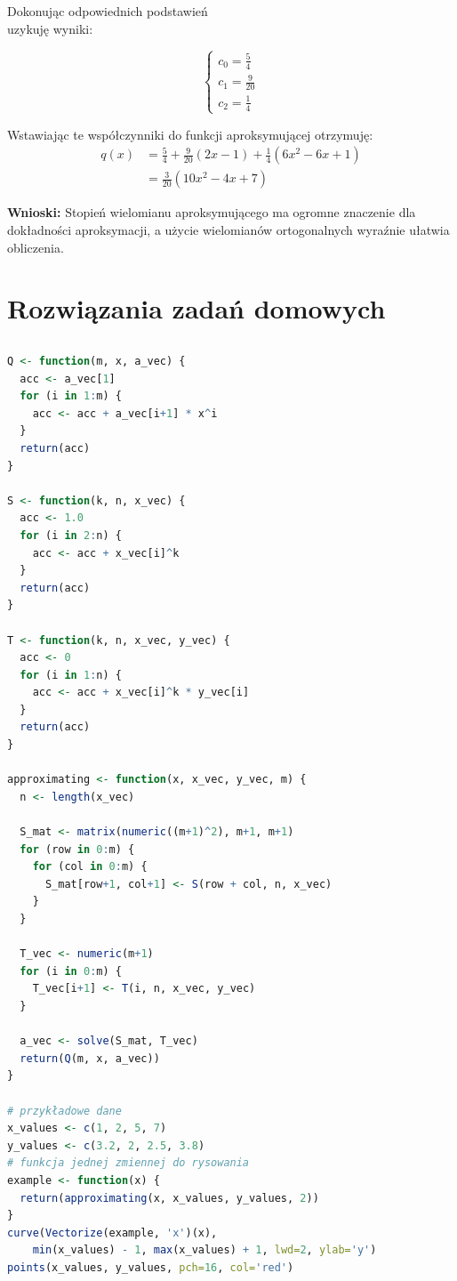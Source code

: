 \documentclass{article}
\begin{document}
\vspace{5mm}
\noindent
Dokonując odpowiednich podstawień\\
uzykuję wyniki:

\[\left\{
\begin{array}{l}
    c_0 = \frac{5}{4}\\
    c_1 = \frac{9}{20}\\
    c_2 = \frac{1}{4}
\end{array}
\right.\]

\noindent
Wstawiając te współczynniki do funkcji aproksymującej otrzymuję:
\begin{align*}
    q(x) &= \frac{5}{4} + \frac{9}{20}(2x - 1) + \frac{1}{4}(6x^2 - 6x + 1)\\
    &= \frac{3}{20} (10x^2 - 4x + 7)
\end{align*}

\vspace{15mm}
\noindent
\textbf{Wnioski:} Stopień wielomianu aproksymującego ma ogromne znaczenie dla dokładności aproksymacji, a użycie wielomianów ortogonalnych wyraźnie ułatwia obliczenia.

\clearpage

\section{Rozwiązania zadań domowych}

\subsection{}
\begin{lstlisting}[language=R]
Q <- function(m, x, a_vec) {
  acc <- a_vec[1]
  for (i in 1:m) {
    acc <- acc + a_vec[i+1] * x^i
  }
  return(acc)
}

S <- function(k, n, x_vec) {
  acc <- 1.0
  for (i in 2:n) {
    acc <- acc + x_vec[i]^k
  }
  return(acc)
}

T <- function(k, n, x_vec, y_vec) {
  acc <- 0
  for (i in 1:n) {
    acc <- acc + x_vec[i]^k * y_vec[i]
  }
  return(acc)
}

approximating <- function(x, x_vec, y_vec, m) {
  n <- length(x_vec)
  
  S_mat <- matrix(numeric((m+1)^2), m+1, m+1)
  for (row in 0:m) {
    for (col in 0:m) {
      S_mat[row+1, col+1] <- S(row + col, n, x_vec)
    }
  }
  
  T_vec <- numeric(m+1)
  for (i in 0:m) {
    T_vec[i+1] <- T(i, n, x_vec, y_vec)
  }
  
  a_vec <- solve(S_mat, T_vec)
  return(Q(m, x, a_vec))
}

# przykładowe dane
x_values <- c(1, 2, 5, 7)
y_values <- c(3.2, 2, 2.5, 3.8)
# funkcja jednej zmiennej do rysowania
example <- function(x) {
  return(approximating(x, x_values, y_values, 2))
}
curve(Vectorize(example, 'x')(x),
    min(x_values) - 1, max(x_values) + 1, lwd=2, ylab='y')
points(x_values, y_values, pch=16, col='red')
\end{lstlisting}
\end{document}
